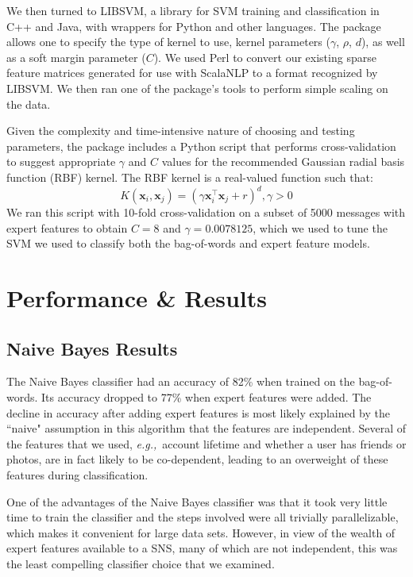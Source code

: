 \documentclass[preprint]{acm_proc_article-sp}
\newcommand{\eg}{{\em e.g.,}~}
\begin{document}
We then turned to LIBSVM, a library for SVM training and classification in C++ and Java, with wrappers for 
Python and other languages. The package allows one to specify the type of kernel to use, kernel parameters 
($\gamma$, $\rho$, $d$), as well as a soft margin parameter ($C$). We used Perl to convert our existing sparse feature 
matrices generated for use with ScalaNLP to a format recognized by LIBSVM. We then ran one of the package's 
tools to perform simple scaling on the data. 

Given the complexity and time-intensive nature of choosing and testing parameters, the 
package includes a Python script that performs cross-validation to suggest appropriate 
$\gamma$ and $C$ values for the recommended Gaussian radial basis function (RBF) kernel. The RBF kernel is 
a real-valued function such that: 
$$K(\mathbf{x}_i, \mathbf{x}_j) = (\gamma\mathbf{x}_i^\intercal\mathbf{x}_j+r)^d, \gamma>0$$
We ran this script with 10-fold cross-validation on a subset of 5000 messages with 
expert features to obtain $C = 8$ and $\gamma = 0.0078125$, which we used to tune 
the SVM we used to classify both the bag-of-words and expert feature models.

\section{Performance \& Results}

\subsection{Naive Bayes Results}

The Naive Bayes classifier had an accuracy of 82\% when trained on the bag-of-words. Its accuracy dropped 
to 77\% when expert features were added. The decline in accuracy after adding expert features is most likely 
explained by the ``naive" assumption in this algorithm that the features are independent. Several of 
the features that we used, \eg{account lifetime and whether a user has friends or photos}, are in 
fact likely to be co-dependent, leading to an overweight of these features during classification. 

One of the advantages of the Naive Bayes classifier was that it took very little time to train the classifier 
and the steps involved were all trivially parallelizable, which makes it convenient for large data sets. 
However, in view of the wealth of expert features available to a SNS, many of which are not independent, this was 
the least compelling classifier choice that we examined.
\end{document}
